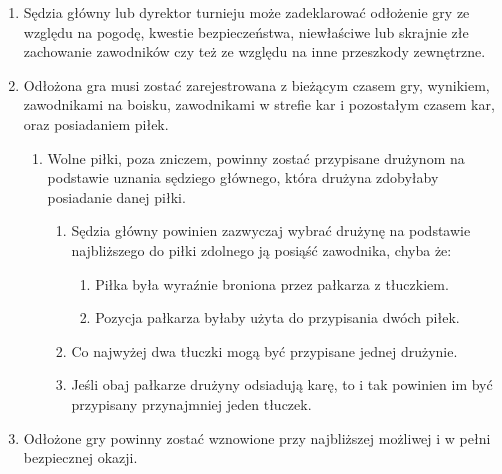 \documentclass[11pt,a4paper]{article}
\renewcommand{\subsubsection}[1]{
  \oldsubsubsection{#1}%
  \label{\thesubsubsection}
}
\begin{document}
\begin{enumerate}

\item
  Sędzia główny lub dyrektor turnieju może zadeklarować odłożenie gry ze
  względu na pogodę, kwestie bezpieczeństwa, niewłaściwe lub skrajnie
  złe zachowanie zawodników czy też ze względu na inne przeszkody
  zewnętrzne.
\item
  Odłożona gra musi zostać zarejestrowana z bieżącym czasem gry,
  wynikiem, zawodnikami na boisku, zawodnikami w strefie kar i
  pozostałym czasem kar, oraz posiadaniem piłek.

  \begin{enumerate}
  
  \item
    Wolne piłki, poza zniczem, powinny zostać przypisane drużynom na
    podstawie uznania sędziego głównego, która drużyna zdobyłaby
    posiadanie danej piłki.

    \begin{enumerate}
    
    \item
      Sędzia główny powinien zazwyczaj wybrać drużynę na podstawie
      najbliższego do piłki zdolnego ją posiąść zawodnika, chyba że:

      \begin{enumerate}
      
      \item
        Piłka była wyraźnie broniona przez pałkarza z tłuczkiem.
      \item
        Pozycja pałkarza byłaby użyta do przypisania dwóch piłek.
      \end{enumerate}
    \item
      Co najwyżej dwa tłuczki mogą być przypisane jednej drużynie.
    \item
      Jeśli obaj pałkarze drużyny odsiadują karę, to i tak powinien im
      być przypisany przynajmniej jeden tłuczek.
    \end{enumerate}
  \end{enumerate}
\item
  Odłożone gry powinny zostać wznowione przy najbliższej możliwej i w
  pełni bezpiecznej okazji.
\end{enumerate}

\subsubsection{Wznawianie odłożonej
gry}
\end{document}
